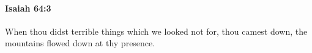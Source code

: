 
		\paragraph{Isaiah 64:3} %
			\label{ISAIAH-64-3}

			When thou didst terrible things which we looked not for, thou camest down, the mountains flowed down at thy presence.


